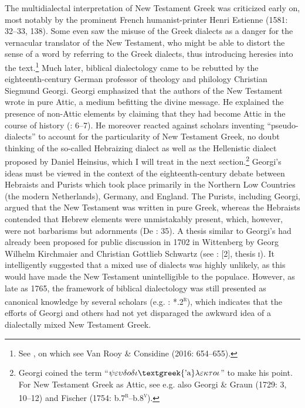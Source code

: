 \documentclass[output=paper]{langsci/langscibook}
\begin{document}
The multidialectal interpretation of New Testament Greek was criticized early on, most notably by the prominent French humanist-printer Henri Estienne (1581: 32–33, 138). Some even saw the misuse of the Greek dialects as a danger for the vernacular translator of the New Testament, who might be able to distort the sense of a word by referring to the Greek dialects, thus introducing heresies into the text.\footnote{See \citet[429]{Rainolds1583}, on which see Van Rooy \& Considine (2016: 654–655).} Much later, biblical dialectology came to be rebutted by the eighteenth-century German professor of theology and philology Christian Siegmund Georgi. Georgi emphasized that the authors of the New Testament wrote in pure Attic, a medium befitting the divine message. He explained the presence of non-Attic elements by claiming that they had become Attic in the course of history (\citealt{Georgi1733}: 6–7). He moreover reacted against scholars inventing “pseudo-dialects” to account for the particularity of New Testament Greek, no doubt thinking of the so-called Hebraizing dialect as well as the Hellenistic dialect proposed by Daniel Heinsius, which I will treat in the next section.\footnote{Georgi coined the term “$\psi \varepsilon \upsilon \delta o\delta \iota \text{\textgreek{'a}}\lambda \varepsilon \kappa \tau o\iota $” to make his point. For New Testament Greek as Attic, see e.g. also Georgi \& Graun (1729: 3, 10–12) and Fischer (1754: b.7\textsc{\textsuperscript{r}}–b.8\textsc{\textsuperscript{v}}).} Georgi’s ideas must be viewed in the context of the eighteenth-century debate between Hebraists and Purists which took place primarily in the Northern Low Countries (the modern Netherlands), Germany, and England. The Purists, including Georgi, argued that the New Testament was written in pure Greek, whereas the Hebraists contended that Hebrew elements were unmistakably present, which, however, were not barbarisms but adornments (De \citealt{Jonge1980}: 35). A thesis similar to Georgi’s had already been proposed for public discussion in 1702 in Wittenberg by Georg Wilhelm Kirchmaier and Christian Gottlieb Schwartz (see \citealt{KirchmaierSchwartz1702}: [2], thesis \textsc{i}). It intelligently suggested that a mixed use of dialects was highly unlikely, as this would have made the New Testament unintelligible to the populace. However, as late as 1765, the framework of biblical dialectology was still presented as canonical knowledge by several scholars (e.g. \citealt{Gottleber1765}: *.2\textsc{\textsuperscript{r}}), which indicates that the efforts of Georgi and others had not yet disparaged the awkward idea of a dialectally mixed New Testament Greek.
\end{document}

